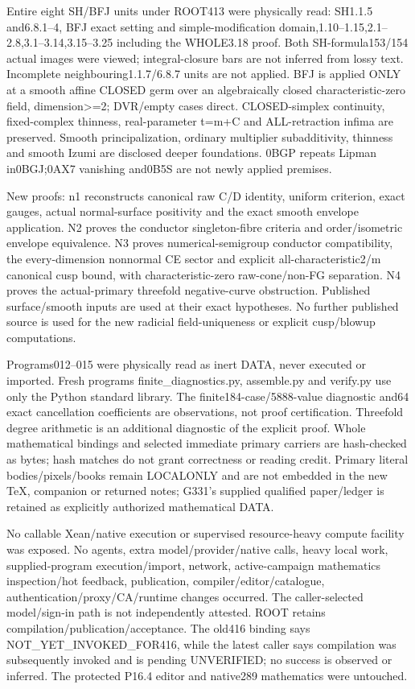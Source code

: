 \documentclass[11pt]{article}
\begin{document}
Entire eight SH/BFJ units under ROOT413 were physically read: SH1.1.5 and6.8.1--4, BFJ exact setting and simple-modification domain,1.10--1.15,2.1--2.8,3.1--3.14,3.15--3.25 including the WHOLE3.18 proof. Both SH-formula153/154 actual images were viewed; integral-closure bars are not inferred from lossy text. Incomplete neighbouring1.1.7/6.8.7 units are not applied. BFJ is applied ONLY at a smooth affine CLOSED germ over an algebraically closed characteristic-zero field, dimension\textgreater{}=2; DVR/empty cases direct. CLOSED-simplex continuity, fixed-complex thinness, real-parameter t=m+C and ALL-retraction infima are preserved. Smooth principalization, ordinary multiplier subadditivity, thinness and smooth Izumi are disclosed deeper foundations. 0BGP repeats Lipman in0BGJ;0AX7 vanishing and0B5S are not newly applied premises.

New proofs: n1 reconstructs canonical raw C/D identity, uniform criterion, exact gauges, actual normal-surface positivity and the exact smooth envelope application. N2 proves the conductor singleton-fibre criteria and order/isometric envelope equivalence. N3 proves numerical-semigroup conductor compatibility, the every-dimension nonnormal CE sector and explicit all-characteristic2/m canonical cusp bound, with characteristic-zero raw-cone/non-FG separation. N4 proves the actual-primary threefold negative-curve obstruction. Published surface/smooth inputs are used at their exact hypotheses. No further published source is used for the new radicial field-uniqueness or explicit cusp/blowup computations.

Programs012--015 were physically read as inert DATA, never executed or imported. Fresh programs finite\_diagnostics.py, assemble.py and verify.py use only the Python standard library. The finite184-case/5888-value diagnostic and64 exact cancellation coefficients are observations, not proof certification. Threefold degree arithmetic is an additional diagnostic of the explicit proof. Whole mathematical bindings and selected immediate primary carriers are hash-checked as bytes; hash matches do not grant correctness or reading credit. Primary literal bodies/pixels/books remain LOCALONLY and are not embedded in the new TeX, companion or returned notes; G331's supplied qualified paper/ledger is retained as explicitly authorized mathematical DATA.

No callable Xean/native execution or supervised resource-heavy compute facility was exposed. No agents, extra model/provider/native calls, heavy local work, supplied-program execution/import, network, active-campaign mathematics inspection/hot feedback, publication, compiler/editor/catalogue, authentication/proxy/CA/runtime changes occurred. The caller-selected model/sign-in path is not independently attested. ROOT retains compilation/publication/acceptance. The old416 binding says NOT\_YET\_INVOKED\_FOR416, while the latest caller says compilation was subsequently invoked and is pending UNVERIFIED; no success is observed or inferred. The protected P16.4 editor and native289 mathematics were untouched.
\end{document}
